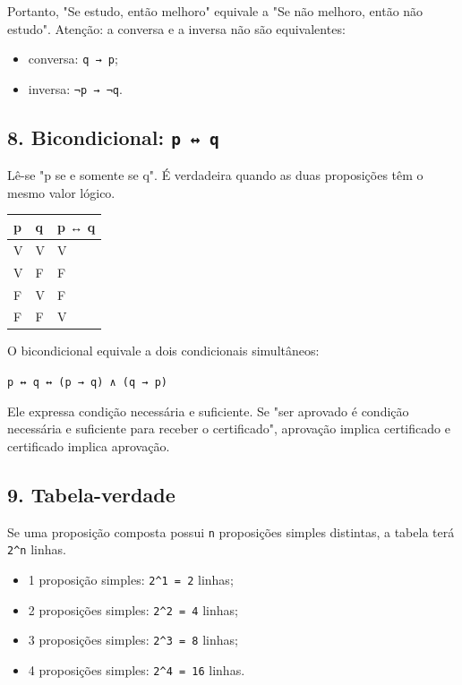 \documentclass[11pt,a4paper]{article}
\begin{document}
Portanto, "Se estudo, então melhoro" equivale a "Se não melhoro, então não estudo". Atenção: a conversa e a inversa não são equivalentes:

\begin{itemize}
  \item conversa: \texttt{q → p};
  \item inversa: \texttt{¬p → ¬q}.
\end{itemize}

\subsection*{8. Bicondicional: \texttt{p ↔ q}}

Lê-se "p se e somente se q". É verdadeira quando as duas proposições têm o mesmo valor lógico.

\begin{tabularx}{\linewidth}{llX}
\toprule
 \textbf{p} & \textbf{q} & \textbf{p ↔ q} \\
\midrule
 V & V & V \\
 V & F & F \\
 F & V & F \\
 F & F & V \\
\bottomrule
\end{tabularx}


O bicondicional equivale a dois condicionais simultâneos:

\texttt{p ↔ q ↔ (p → q) ∧ (q → p)}

Ele expressa condição necessária e suficiente. Se "ser aprovado é condição necessária e suficiente para receber o certificado", aprovação implica certificado e certificado implica aprovação.

\subsection*{9. Tabela-verdade}

Se uma proposição composta possui \texttt{n} proposições simples distintas, a tabela terá \texttt{2\textasciicircum{}n} linhas.

\begin{itemize}
  \item 1 proposição simples: \texttt{2\textasciicircum{}1 = 2} linhas;
  \item 2 proposições simples: \texttt{2\textasciicircum{}2 = 4} linhas;
  \item 3 proposições simples: \texttt{2\textasciicircum{}3 = 8} linhas;
  \item 4 proposições simples: \texttt{2\textasciicircum{}4 = 16} linhas.
\end{itemize}
\end{document}
